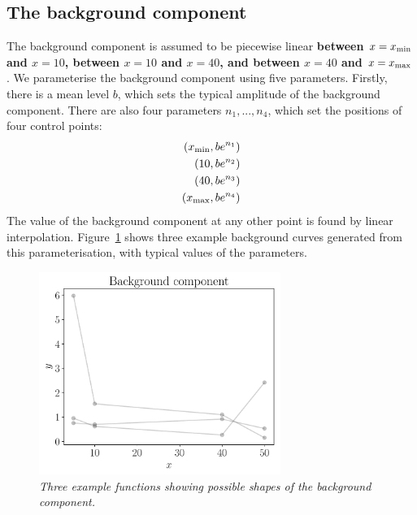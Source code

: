 \documentclass[a4paper, 12pt]{article}
\newcommand{\x}{x}
\newcommand{\todo}{\color{orange} \bf}
\begin{document}
\subsection{The background component}
The background component is assumed to be piecewise linear
{\todo between $\x=\x_{\rm min}$ and $\x=10$, between $\x=10$ and $\x=40$,
and between $\x=40$ and $\x=\x_{\rm max}$}.
We parameterise the background component using
five parameters. Firstly, there is a mean level $b$, which sets the
typical amplitude of the background component. There are also four parameters
$n_1, ..., n_4$, which set the positions of four control points:
\begin{align}
\left(\x_{\rm min}, be^{n_1}\right) \nonumber\\
\left(10, be^{n_2}\right) \nonumber\\
\left(40, be^{n_3}\right) \nonumber\\
\left(\x_{\rm max}, be^{n_4}\right) \nonumber
\end{align}
The value of the background component at any other point is found by
linear interpolation. Figure~\ref{fig:background} shows three example
background curves generated from this parameterisation, with typical
values of the parameters.

\begin{figure}
\centering
\includegraphics[width=0.7\textwidth]{figures/background.pdf}
\caption{\it Three example functions showing possible shapes of the
background component.\label{fig:background}}
\end{figure}
\end{document}

